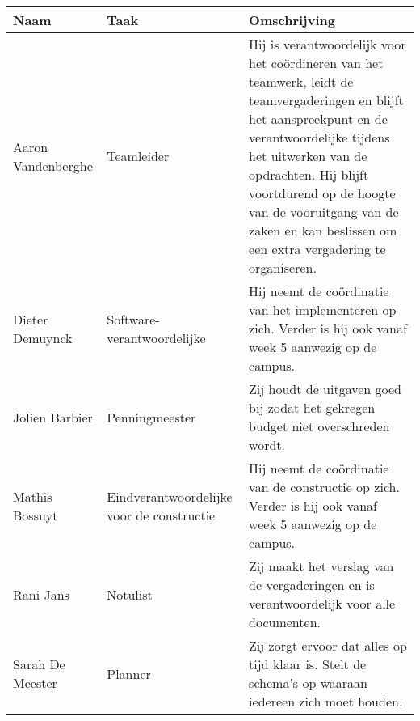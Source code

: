 \documentclass[landscape,12pt]{article}
\begin{document}
	
	
	\begin{table}
		\centering
		
		\begin{tabular}{p{4cm}p{5cm}p{7cm}}
			\toprule
			Naam & Taak & Omschrijving \\ 
			\midrule
			Aaron Vandenberghe & Teamleider & Hij is verantwoordelijk voor het coördineren van het teamwerk, leidt de teamvergaderingen en blijft het aanspreekpunt en de verantwoordelijke tijdens het uitwerken van de opdrachten. Hij blijft voortdurend op de hoogte van de vooruitgang van de zaken en kan beslissen om een extra vergadering te organiseren.\\
			\midrule
			Dieter Demuynck & Software-verantwoordelijke & Hij neemt de coördinatie van het implementeren op zich. Verder is hij ook vanaf week 5 aanwezig op de campus.\\
			\midrule
			Jolien Barbier & Penningmeester & Zij houdt de uitgaven goed bij zodat het gekregen budget niet overschreden wordt.\\
			\midrule
			Mathis Bossuyt & Eindverantwoordelijke voor de constructie & Hij neemt de coördinatie van de constructie op zich. Verder is hij ook vanaf week 5 aanwezig op de campus.\\
			\midrule
			Rani Jans & Notulist & Zij maakt het verslag van de vergaderingen en is verantwoordelijk voor alle documenten.\\
			\midrule
			Sarah De Meester & Planner & Zij zorgt ervoor dat alles op tijd klaar is. Stelt de schema's op waaraan iedereen zich moet houden. \\
			
			\bottomrule
		\end{tabular}
	\end{table}
\end{document}
